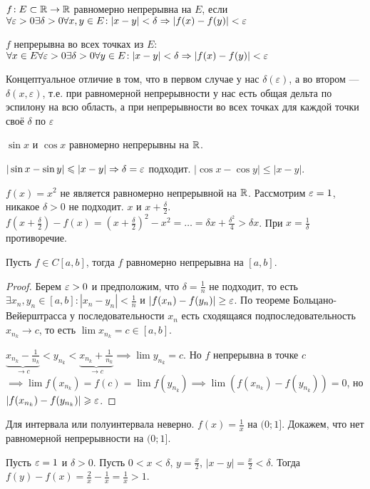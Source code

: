 \begin{definition}
    $f\!: E \subset \mathbb{R} \to \mathbb{R}$ равномерно непрерывна на  $E$, если  $\forall \varepsilon > 0 \exists \delta > 0 \forall x, y \in E\!: |x-y| < \delta \Rightarrow |f(x)-f(y)| < \varepsilon$
\end{definition}
\begin{definition}
    $f$ непрерывна во всех точках из  $E$:\\
    $\forall x \in E \forall \varepsilon > 0 \exists \delta > 0 \forall y \in E\!: |x-y| < \delta \Rightarrow |f(x)-f(y)| < \varepsilon$
\end{definition}
Концептуальное отличие в том, что в первом случае у нас $\delta(\varepsilon)$, а во втором --- $\delta(x, \varepsilon)$, т.е. при равномерной непрерывности у нас есть общая дельта по эспилону на всю область, а при непрерывности во всех точках для каждой точки своё $\delta$ по $\varepsilon$
\begin{example}
    $\sin x$ и  $\cos x$ равномерно непрерывны на  $\mathbb{R}$.

     $|\sin x - \sin y| \leqslant |x-y| \Rightarrow \delta = \varepsilon$ подходит. $|\cos x - \cos y| \le |x-y|$.
\end{example}
\begin{example}
    $f(x) = x^2$ не является равномерно непрерывной на $\mathbb{R}$. Рассмотрим  $\varepsilon = 1$, никакое  $\delta > 0$ не подходит.  $x$ и  $x + \frac{\delta}{2}$. $f(x + \frac{\delta}{2}) - f(x)  = (x+\frac{\delta}{2})^2 - x^2 = \ldots = \delta x + \frac{\delta^2}{4} > \delta x$.
    При $x = \frac{1}{\delta}$ противоречие. 
\end{example}
\begin{theorem}
    Пусть $f \in C[a, b]$, тогда $f$ равномерно непрерывна на  $[a, b]$.
\end{theorem}
\begin{proof}
    Берем $\varepsilon > 0$ и предположим, что  $\delta = \frac{1}{n}$ не подходит, то есть $\exists x_n, y_n \in [a, b]\!: |x_n - y_n| < \frac{1}{n}$ и $|f(x_n) - f(y_n)| \geq \varepsilon$. По теореме Больцано-Вейерштрасса у последовательности $x_n$ есть сходящаяся подпоследовательность  $x_{n_k} \to c$, то есть  $\lim x_{n_k} = c \in [a, b]$.

    $\underbrace{x_{n_k} - \frac{1}{n_k}}_{\to c} < y_{n_k} < \underbrace{x_{n_k} + \frac{1}{n_k}}_{\to c} \implies \lim y_{n_k} = c$. Но $f$ непрерывна в точке  $c$  $\implies \lim f(x_{n_k}) = f(c) = \lim f(y_{n_k}) \implies \lim (f(x_{n_k}) - f(y_{n_k})) = 0$, но $|f(x_{n_k}) - f(y_{n_k})| \geqslant \varepsilon$.
\end{proof}
\begin{remark}
    Для интервала или полуинтервала неверно. $f(x) = \frac{1}{x}$ на $(0; 1]$. Докажем, что нет равномерной непрерывности на  $(0; 1]$. 

    Пусть  $\varepsilon = 1$ и  $\delta > 0$. Пусть  $0 < x < \delta$,  $y = \frac{x}{2}$, $|x-y| = \frac{x}{2} < \delta$. Тогда $f(y) - f(x) = \frac{2}{x} - \frac{1}{x} = \frac{1}{x} > 1$.
\end{remark}

